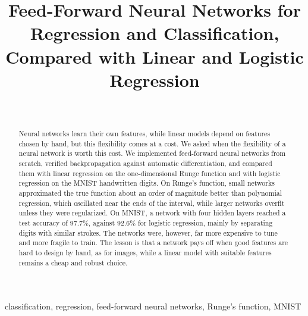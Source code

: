 \documentclass[a4paper]{IEEEtran}
\begin{document}
\title{Feed-Forward Neural Networks for Regression and Classification,
Compared with Linear and Logistic Regression}

\author{
    \\
}

\maketitle

\begin{abstract}
Neural networks learn their own features, while linear models depend on features chosen by
hand, but this flexibility comes at a cost. We asked when the flexibility of a neural network
is worth this cost. We implemented feed-forward neural networks from scratch, verified
backpropagation against automatic differentiation, and compared them with linear regression
on the one-dimensional Runge function and with logistic regression on the MNIST handwritten
digits. On Runge's function, small networks approximated the true function about an order of
magnitude better than polynomial regression, which oscillated near the ends of the interval,
while larger networks overfit unless they were regularized. On MNIST, a network with four
hidden layers reached a test accuracy of 97.7\%, against 92.6\% for logistic regression,
mainly by separating digits with similar strokes. The networks were, however, far more
expensive to tune and more fragile to train. The lesson is that a network pays off when good
features are hard to design by hand, as for images, while a linear model with suitable
features remains a cheap and robust choice.
\end{abstract}

\begin{IEEEkeywords}
classification, regression, feed-forward neural networks, Runge's function, MNIST
\end{IEEEkeywords}








\printbibliography

\appendix





\end{document}
